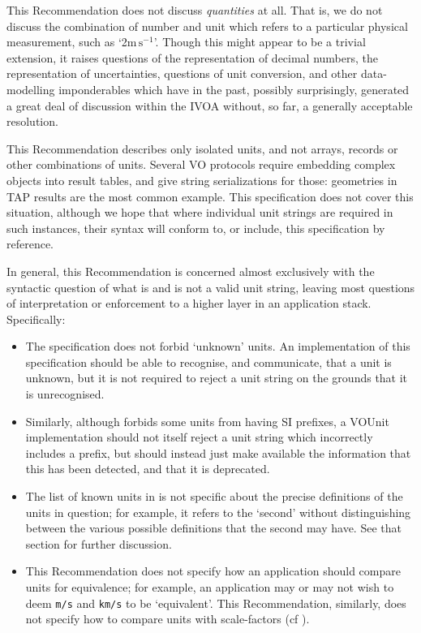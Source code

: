 \documentclass[11pt,a4paper]{ivoa}
\newcommand{\unit}[1]{\texttt{\small\color{orange}#1}}
\begin{document}
This Recommendation does not discuss \emph{quantities} at all.  That
is, we do not discuss the combination of number and unit which refers
to a particular physical measurement, such as `2$\mathrm m\,\mathrm
s^{-1}$'.  Though this might appear to be a trivial extension, it
raises questions of the representation of decimal numbers, the
representation of uncertainties, questions of unit conversion, and
other data-modelling imponderables which have in the past, possibly
surprisingly, generated a great deal of discussion within the
IVOA without, so far, a generally acceptable resolution.

This Recommendation describes only isolated units, and not arrays,
records or other combinations of units.  Several VO protocols require
embedding complex objects into result tables, and give string
serializations for those: geometries in TAP results are the most
common example.  This specification does not cover this situation,
although we hope that where individual unit strings are required in
such instances, their syntax will conform to, or include, this
specification by reference.

In general, this Recommendation is concerned almost exclusively with
the syntactic question of what is and is not a valid unit string,
leaving most questions of interpretation or enforcement to a higher layer in an
application stack.  Specifically:
\begin{itemize}
\item The specification does not forbid `unknown' units.  An
implementation of this specification should be able to recognise, and
communicate, that a unit is unknown, but it is not required to reject
a unit string on the grounds that it is unrecognised.

\item Similarly, although  forbids some
units from having SI prefixes, a VOUnit implementation should not
itself reject a unit string which incorrectly includes a prefix, but
should instead just make available the information that this has been
detected, and that it is deprecated.

\item The list of known units in  is not
specific about the precise definitions of the units in question; for
example, it refers to the `second' without distinguishing between the
various possible definitions that the second may have.
See that section for further discussion.

\item This Recommendation does not specify how an application should
compare units for equivalence; for example, an application may or may
not wish to deem \unit{m/s} and \unit{km/s} to be `equivalent'.
This Recommendation, similarly, does not specify how to compare units
with scale-factors (cf ).
\end{itemize}
\end{document}
